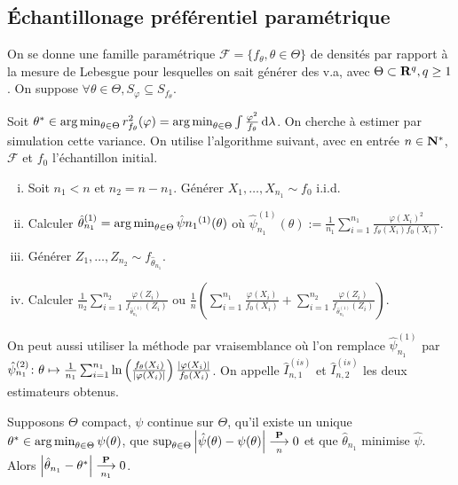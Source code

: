 \subsection{Échantillonage préférentiel paramétrique}

	On se donne une famille paramétrique $\mathcal{F} = \{ f_\theta, \theta \in \Theta \}$ de densités par rapport à la mesure de Lebesgue pour lesquelles on sait générer des v.a, avec $\Theta \subset \mathbf{R}^q, q \geq 1$.
	On suppose $\forall \theta \in \Theta, S_\varphi \subseteq S_{f_\theta}$.
	
	Soit $\theta^* \in \operatorname{arg\, min}_{\theta \in \Theta} r_{f_\theta}^2(\varphi) = \operatorname{arg\, min}_{\theta \in \Theta} \int \frac{\varphi^2}{f_\theta} \mathop{}\mathopen{}\mathrm{d} \lambda$.
	On cherche à estimer par simulation cette variance.
	On utilise l'algorithme suivant, avec en entrée $n \in \mathbf{N}^*$, $\mathcal{F}$ et $f_0$ l'échantillon initial.
	\begin{enumerate}[(i)]
		\item Soit $n_1 < n$ et $n_2 = n - n_1$. Générer $X_1,\ldots,X_{n_1} \sim f_0$ i.i.d.
		\item Calculer $\hat{\theta}_{n_1}^{(1)} = \operatorname{arg\, min}_{\theta \in \Theta} \hat{\psi}{n_1}^{(1)}(\theta)$ où $\hat{\psi}_{n_1}^{(1)}(\theta) := \frac{1}{n_1} \sum_{i = 1}^{n_1} \frac{\varphi(X_i)^2}{ f_\theta(X_i) f_0(X_i) }$.
		\item Générer $Z_1,\ldots,Z_{n_2} \sim f_{\hat{\theta}_{n_1}}$.
		\item Calculer $\frac{1}{n_2} \sum_{i = 1}^{n_2} \frac{\varphi(Z_i)}{f_{\hat{\theta}_{n_1}^{(1)}}(Z_i)}$
			ou $\frac{1}{n} \left( \sum_{i = 1}^{n_1} \frac{\varphi(X_i)}{f_0(X_i)} + \sum_{i = 1}^{n_2} \frac{\varphi(Z_i)}{f_{\hat{\theta}_{n_1}^{(1)}}(Z_i)} \right)$.
	\end{enumerate}
	
	\noindent On peut aussi utiliser la méthode par vraisemblance où l'on remplace $\hat{\psi}_{n_1}^{(1)}$ par $\hat{\psi}_{n_1}^{(2)} \colon \theta \mapsto \frac{1}{n_1} \sum_{i = 1}^{n_1} \ln \left( \frac{f_\theta(X_i)}{\left\lvert\varphi(X_i)\right\rvert} \right) \frac{\left\lvert\varphi(X_i)\right\rvert}{f_0(X_i)}$.
	On appelle $\hat{I}_{n,1}^{(is)}$ et $\hat{I}_{n,2}^{(is)}$ les deux estimateurs obtenus.
	
	\begin{lem}
		Supposons $\Theta$ compact, $\psi$ continue sur $\Theta$, qu'il existe un unique $\theta^* \in \operatorname{arg\, min}_{\theta \in \Theta} \psi(\theta)$, que $\sup_{\theta \in \Theta} \left\lvert\hat{\psi}(\theta) - \psi(\theta)\right\rvert \underset{n}{\overset{\mathbf{P}}{\longrightarrow}} 0$ et que $\hat{\theta}_{n_1}$ minimise $\hat{\psi}$.
		Alors $\left\lvert\hat{\theta}_{n_1} - \theta^*\right\rvert \underset{n_1}{\overset{\mathbf{P}}{\longrightarrow}} 0$.
	\end{lem}
	

